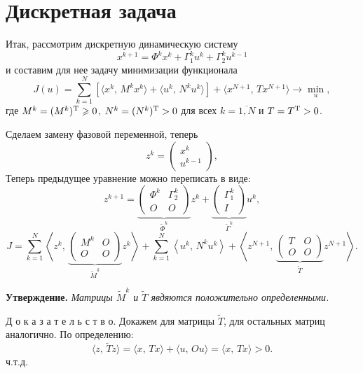 \section{Дискретная задача}

Итак, рассмотрим дискретную динамическую систему
$$
        x^{k+1} = \Phi^k x^k + \Gamma_1^k u^k + \Gamma_2^k u^{k-1}
$$
и составим для нее задачу минимизации функционала
$$
        J(u) = \sum\limits_{k = 1}^{N}
        \left[
\langle
x^k,\,M^k x^k
\rangle
+
\langle
u^k,\,N^k u^k
\rangle
        \right]
        +
        \langle
        x^{N+1}
        ,\,
        T x^{N+1}
        \rangle
        \to \min\limits_{u},
$$
где $M^k = (M^k)^\mathrm{T} \geqslant 0$, $N^k = (N^k)^\mathrm{T} > 0$ для всех $k = \overline{1,N}$ и  $T = T^\mathrm{T} > 0$.

Сделаем замену фазовой переменной, теперь
$$
        z^k = \begin{pmatrix}
x^k\\
u^{k-1}
        \end{pmatrix},
$$
Теперь предыдущее уравнение можно переписать в виде:
$$
        z^{k+1} = \underbrace{\begin{pmatrix}
\Phi^k & \Gamma_2^k\\
O & O
        \end{pmatrix}}_{\tilde \Phi^k}
        z^k + \underbrace{
        \begin{pmatrix}
\Gamma_1^k \\
I
        \end{pmatrix}
        }_{\tilde\Gamma^k} u^k,
$$
$$
        J = \sum\limits_{k = 1}^{N}
        \left
        \langle
z^k,\,
\underbrace{
\begin{pmatrix}
M^k & O \\
O & O
\end{pmatrix}}_{\tilde M^k}
z^k
        \right
        \rangle
        +
        \sum\limits_{k = 1}^{N}
        \left
        \langle
u^k,\,
N^k
u^k
        \right
        \rangle
        +
        \left
        \langle
z^{N+1},\,
\underbrace{
\begin{pmatrix}
T & O \\
O & O
\end{pmatrix}}_{\tilde T}
z^{N+1}
        \right
        \rangle.    
$$

\textbf{Утверждение.} \textit{Матрицы $\tilde M^k$ и $\tilde T$ явдяются положительно определенными.}

Д о к а з а т е л ь с т в о. Докажем для матрицы $\tilde T$, для остальных матриц аналогично. По определению:
$$
        \langle z,\, \tilde T z \rangle =
        \langle x,\, Tx \rangle + \langle u,\, Ou\rangle = 
        \langle x,\, Tx \rangle > 0.
$$
ч.т.д.

